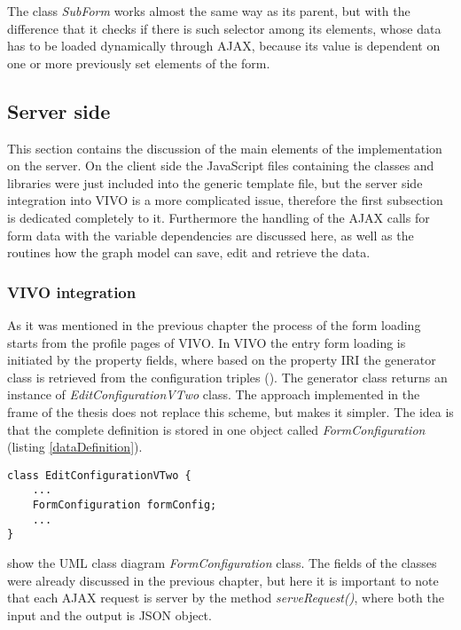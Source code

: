 The class \textit{SubForm} works almost the same way as its parent, but with the difference that it checks if there is such selector among its elements, whose data has to be loaded dynamically through AJAX, because its value is dependent on one or more previously set elements of the form.  

\newpage
\subsection{Server side} 

This section contains the discussion of the main elements of the implementation on the server. On the client side the JavaScript files containing the classes and libraries were just included into the generic template file, but the server side integration into VIVO is a more complicated issue, therefore the first subsection is dedicated completely to it. Furthermore the handling of the AJAX calls for form data with the variable dependencies are discussed here, as well as the routines how the graph model can save, edit and retrieve the data.

\subsubsection{VIVO integration}

As it was mentioned in the previous chapter the process of the form loading starts from the profile pages of VIVO. In VIVO the entry form loading is initiated by the property fields, where based on the property IRI the generator class is retrieved from the configuration triples (). The generator class returns an instance of \textit{EditConfigurationVTwo} class. The approach implemented in the frame of the thesis does not replace this scheme, but makes it simpler. The idea is that the complete definition is stored in one object called \textit{FormConfiguration} (listing \ref{dataDefinition}).

\begin{lstlisting}[basicstyle=\footnotesize, frame=single, caption={Added field to VIVO class}, label=dataDefinition, captionpos=b, belowskip=1em, aboveskip=2em]
class EditConfigurationVTwo {
	...
	FormConfiguration formConfig;
	...
}
\end{lstlisting}

 show the UML class diagram \textit{FormConfiguration} class. The fields of the classes were already discussed in the previous chapter, but here it is important to note that each AJAX request is server by the method \textit{serveRequest()}, where both the input and the output is JSON object.

